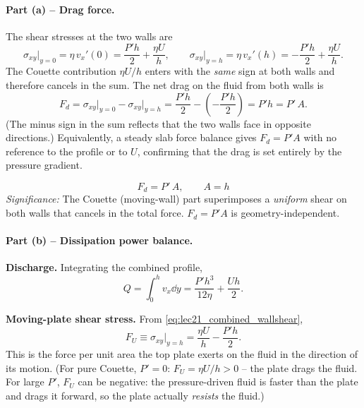 \documentclass[../main.tex]{subfiles}
\begin{document}
\paragraph{Part (a) -- Drag force.}
The shear stresses at the two walls are
\begin{equation}
  \sigma_{xy}\big|_{y=0}=\eta\,v_x'(0)=\frac{P'h}{2}+\frac{\eta U}{h},\qquad
  \sigma_{xy}\big|_{y=h}=\eta\,v_x'(h)=-\frac{P'h}{2}+\frac{\eta U}{h}.
  \label{eq:lec21_combined_wallshear}
\end{equation}
The Couette contribution $\eta U/h$ enters with the \emph{same} sign at both walls and therefore cancels in the sum. The net drag on the fluid from both walls is
\begin{equation}
  F_d=\sigma_{xy}\big|_{y=0}-\sigma_{xy}\big|_{y=h}
     =\frac{P'h}{2}-\left(-\frac{P'h}{2}\right)=P'h=P'\,A.
  \label{eq:lec21_combined_Fd}
\end{equation}
(The minus sign in the sum reflects that the two walls face in opposite directions.) Equivalently, a steady slab force balance gives $F_d=P'A$ with no reference to the profile or to $U$, confirming that the drag is set entirely by the pressure gradient.

\begin{equation}
  \boxed{\;F_d=P'\,A,\qquad A=h\;}
  \label{eq:lec21_channel_force}
\end{equation}
\textit{Significance:} The Couette (moving-wall) part superimposes a \emph{uniform} shear on both walls that cancels in the total force. $F_d=P'A$ is geometry-independent.

\paragraph{Part (b) -- Dissipation power balance.}
\textbf{Discharge.} Integrating the combined profile,
\begin{equation}
  Q=\int_0^h v_x\dd{y}
   =\frac{P'h^3}{12\eta}+\frac{Uh}{2}.
  \label{eq:lec21_combined_Q}
\end{equation}

\textbf{Moving-plate shear stress.} From \eqref{eq:lec21_combined_wallshear},
\begin{equation}
  F_U\equiv\sigma_{xy}\big|_{y=h}=\frac{\eta U}{h}-\frac{P'h}{2}.
  \label{eq:lec21_FU}
\end{equation}
This is the force per unit area the top plate exerts on the fluid in the direction of its motion. (For pure Couette, $P'=0$: $F_U=\eta U/h>0$ -- the plate drags the fluid. For large $P'$, $F_U$ can be negative: the pressure-driven fluid is faster than the plate and drags it forward, so the plate actually \emph{resists} the fluid.)
\end{document}
